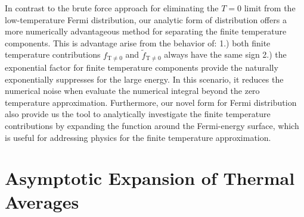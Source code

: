\documentclass[sn-mathphys,Numbered]{sn-jnl}
\begin{document}
In contrast to the brute force approach for eliminating the $T=0$ limit from the low-temperature Fermi distribution, our analytic form of distribution offers a more numerically advantageous method for separating the finite temperature components. This is advantage arise from the behavior of: 1.) both finite temperature contributions $f_\mathrm{T\neq0}$ and $\widetilde f_\mathrm{T\neq0}$ always have the same sign 2.) the exponential factor for finite temperature components provide the naturally exponentially suppresses for the large energy. In this scenario, it reduces the numerical noise when evaluate the numerical integral beyond the zero temperature approximation. Furthermore, our novel form for Fermi distribution also provide us the tool to analytically investigate the finite temperature contributions by expanding the function around the Fermi-energy surface, which is useful for addressing physics for the finite temperature approximation.


\section{Asymptotic Expansion of Thermal Averages }
\end{document}

